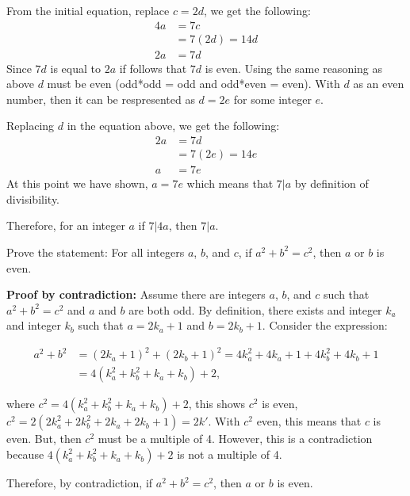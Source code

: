 \begin{questions}
\begin{solution}
  From the initial equation, replace $c=2d$, we get the following: 
  \begin{align*}
    4a &= 7c \\
      &= 7(2d) = 14d \\
    2a &= 7d \tag{divide by 2}
  \end{align*}
  Since $7d$ is equal to $2a$ if follows that $7d$ is even. Using the same reasoning as above $d$ must be even (odd*odd = odd and odd*even = even).  With $d$ as an even number, then it can be respresented as $d = 2e$ for some integer $e$. 

  Replacing $d$ in the equation above, we get the following:
  \begin{align*}
    2a &= 7d \\
      &= 7(2e) = 14e \\
    a &= 7e \tag{divide by 2}
  \end{align*}
  At this point we have shown, $a = 7e$ which means that $7 | a$ by definition of divisibility. 

  Therefore, for an integer $a$ if $7 | 4a$, then $7 | a$.

  \end{solution}


 Prove the statement: For all integers $a$, $b$, and $c$, if $a^2 + b^2 = c^2$, then $a$ or $b$ is even.
   \ifprintanswers
        \vspace{-10pt}
    \fi
\begin{solution} 
\textbf{Proof by contradiction:} Assume there are integers $a$, $b$, and $c$ such that $a^2 + b^2 = c^2$ and $a$ and $b$ are both odd.  By definition, there exists and integer $k_a$ and integer $k_b$ such that $a = 2k_a + 1$ and $b = 2k_b + 1$.  Consider the expression: 

\begin{align*}
  a^2 + b^2 &= (2k_a +1)^2 + (2k_b + 1)^2 = 4k_a^2 + 4k_a + 1 + 4k_b^2 + 4k_b + 1 \\
   &= 4(k_a^2 + k_b^2 + k_a + k_b) + 2,
\end{align*}

where $c^2 = 4(k_a^2 + k_b^2 + k_a + k_b) + 2$, this shows $c^2$ is even, $c^2 = 2(2k_a^2 + 2k_b^2 + 2k_a + 2k_b + 1) = 2k'$.  With $c^2$ even, this means that $c$ is even.  But, then $c^2$ must be a multiple of 4. However, this is a contradiction because $4(k_a^2 + k_b^2 + k_a + k_b) + 2$ is not a multiple of 4. 

Therefore, by contradiction, if $a^2 + b^2 = c^2$, then $a$ or $b$ is even.
\end{solution}



\end{questions}
